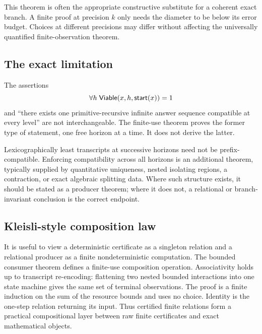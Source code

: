 This theorem is often the appropriate constructive substitute for a coherent exact branch.  A finite proof at precision $k$ only needs the diameter to be below its error budget.  Choices at different precisions may differ without affecting the universally quantified finite-observation theorem.

\subsection{The exact limitation}

\begin{warning}
\label{warn:no-infinite-path}
The assertions
\[
 \forall h\;\mathsf{Viable}(x,h,\mathsf{start}(x))=1
\]
and ``there exists one primitive-recursive infinite answer sequence compatible at every level'' are not interchangeable.  The finite-use theorem proves the former type of statement, one free horizon at a time.  It does not derive the latter.
\end{warning}

Lexicographically least transcripts at successive horizons need not be prefix-compatible.  Enforcing compatibility across all horizons is an additional theorem, typically supplied by quantitative uniqueness, nested isolating regions, a contraction, or exact algebraic splitting data.  Where such structure exists, it should be stated as a producer theorem; where it does not, a relational or branch-invariant conclusion is the correct endpoint.

\subsection{Kleisli-style composition law}

It is useful to view a deterministic certificate as a singleton relation and a relational producer as a finite nondeterministic computation.  The bounded consumer theorem defines a finite-use composition operation.  Associativity holds up to transcript re-encoding: flattening two nested bounded interactions into one state machine gives the same set of terminal observations.  The proof is a finite induction on the sum of the resource bounds and uses no choice.  Identity is the one-step relation returning its input.  Thus certified finite relations form a practical compositional layer between raw finite certificates and exact mathematical objects.
